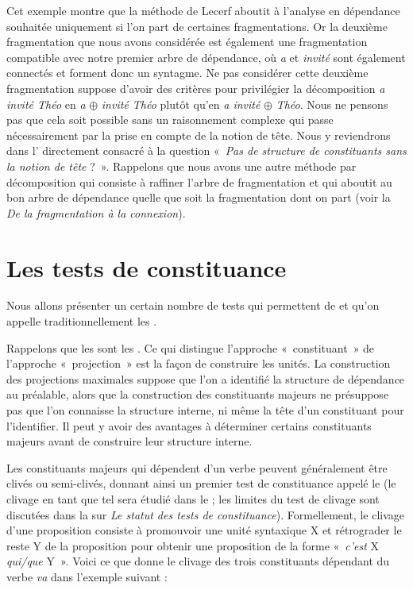 {    Cet exemple montre que la méthode de Lecerf aboutit à l’analyse en dépendance souhaitée uniquement si l’on part de certaines fragmentations. Or la deuxième fragmentation que nous avons considérée est également une fragmentation compatible avec notre premier arbre de dépendance, où \textit{a} et \textit{invité} sont également connectés et forment donc un syntagme. Ne pas considérer cette deuxième fragmentation suppose d’avoir des critères pour privilégier la décomposition \textit{a invité Théo} en \textit{a} \textrm{${\oplus}$} \textit{invité Théo} plutôt qu’en \textit{a invité} \textrm{${\oplus}$} \textit{Théo}. Nous ne pensons pas que cela soit possible sans un raisonnement complexe qui passe nécessairement par la prise en compte de la notion de tête. Nous y reviendrons dans l’ directement consacré à la question «~\textit{Pas de structure de constituants sans la notion de tête} ?~». Rappelons que nous avons une autre méthode par décomposition qui consiste à raffiner l’arbre de fragmentation et qui aboutit au bon arbre de dépendance quelle que soit la fragmentation dont on part (voir la  \textit{De la fragmentation à la connexion}).
}
\section{Les tests de constituance}\label{sec:3.4.10}

Nous allons présenter un certain nombre de tests qui permettent de  et qu’on appelle traditionnellement les .

Rappelons que les  sont les . Ce qui distingue l’approche «~constituant~» de l’approche «~projection~» est la façon de construire les unités. La construction des projections maximales suppose que l’on a identifié la structure de dépendance au préalable, alors que la construction des constituants majeurs ne présuppose pas que l’on connaisse la structure interne, ni même la tête d’un constituant pour l’identifier. Il peut y avoir des avantages à déterminer certains constituants majeurs avant de construire leur structure interne.\pagebreak

Les constituants majeurs qui dépendent d’un verbe peuvent généralement être clivés ou semi-clivés, donnant ainsi un premier test de constituance appelé le  (le clivage en tant que tel sera étudié dans le  ; les limites du test de clivage sont discutées dans la  sur \textit{Le statut des tests de constituance}). Formellement, le clivage d'une proposition consiste à promouvoir une unité syntaxique X et rétrograder le reste Y de la proposition pour obtenir une proposition de la forme «~\textit{c'est} X \textit{qui/que}
Y~».
Voici ce que donne le clivage des trois constituants dépendant du verbe \textit{va} dans l’exemple suivant :

